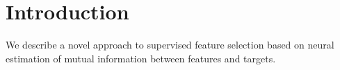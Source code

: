 \section{Introduction}
We describe 
a novel approach to supervised feature selection 
based on 
neural estimation of mutual information 
between
features 
and 
targets.



